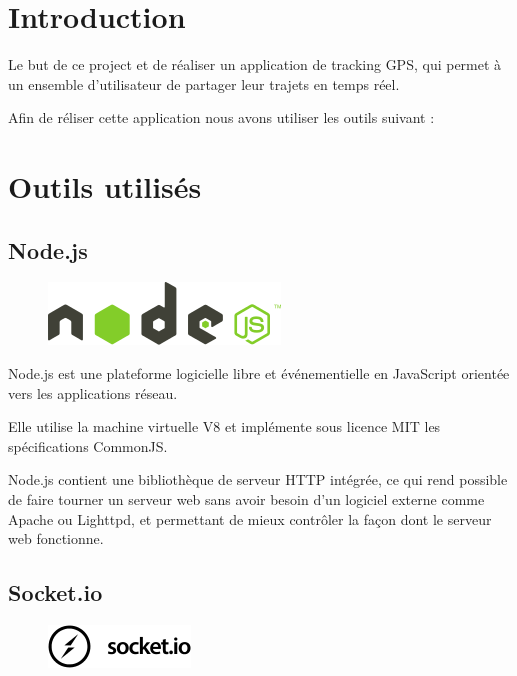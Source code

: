 \documentclass[a4paper]{article}
\begin{document}
\section{Introduction}
Le but de ce project et de réaliser un application de tracking GPS, qui 
permet à un ensemble d'utilisateur de partager leur trajets en temps réel.

Afin de réliser cette application nous avons utiliser les outils suivant :

\section{Outils utilisés}
\subsection{Node.js}

\begin{figure}[H]
  \begin{center}
  \includegraphics[scale=0.5]{nodejs.png}
  \end{center}
\end{figure}

Node.js est une plateforme logicielle libre et événementielle en 
JavaScript orientée vers les applications réseau.

Elle utilise la machine virtuelle V8 et implémente sous 
licence MIT les spécifications CommonJS. 

Node.js contient une bibliothèque de 
serveur HTTP intégrée, ce qui rend possible de faire tourner un serveur 
web sans avoir besoin d'un logiciel externe comme Apache ou Lighttpd, 
et permettant de mieux contrôler la façon dont le serveur web fonctionne.

\subsection{Socket.io}

\begin{figure}[H]
  \begin{center}
  \includegraphics[scale=1]{socketio.png}
  \end{center}
\end{figure}
\end{document}
